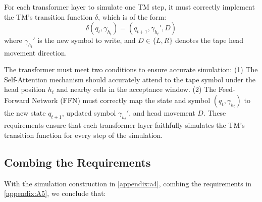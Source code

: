 For each transformer layer to simulate one TM step, it must correctly implement the TM’s transition function \( \delta \), which is of the form:
\[
\delta(q_t, \gamma_{h_t}) = (q_{t+1}, \gamma_{h_t}', D)
\]
where \( \gamma_{h_t}' \) is the new symbol to write, and \( D \in \{L, R\} \) denotes the tape head movement direction.

The transformer must meet two conditions to ensure accurate simulation:
(1) The Self-Attention mechanism should accurately attend to the tape symbol under the head position \( h_t \) and nearby cells in the acceptance window.
(2) The Feed-Forward Network (FFN) must correctly map the state and symbol \( (q_t, \gamma_{h_t}) \) to the new state \( q_{t+1} \), updated symbol \( \gamma_{h_t}' \), and head movement \( D \).
These requirements ensure that each transformer layer faithfully simulates the TM's transition function for every step of the simulation.

\subsection{Combing the Requirements}
With the simulation construction in \ref{appendix:a4}, combing the requirements in \ref{appendix:A5}, we conclude that:


